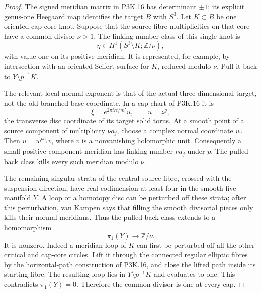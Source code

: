 \begin{proof}
The signed meridian matrix in P3K.16 has determinant
\(\pm1\); its explicit genus-one Heegaard map identifies
the target \(B\) with \(S^3\).  Let \(K\subset B\)
be one oriented cap-core knot.  Suppose that the source
fibre multiplicities on that core have a common divisor
\(\nu>1\).  The linking-number class of this single knot is
\[
            \eta\in H^1(S^3\setminus K;\mathbb Z/\nu),
\]
with value one on its positive meridian.  It is represented,
for example, by intersection with an oriented Seifert surface
for \(K\), reduced modulo \(\nu\).  Pull it back to
\(Y\setminus p^{-1}K\).

The relevant local normal exponent is that of the actual
three-dimensional target, not the old branched base coordinate.
In a cap chart of P3K.16 it is
\[
        \xi=e^{2\pi i rt/m'}u,
        \qquad u=z^g,
\]
the transverse disc coordinate of its target solid torus.
At a smooth point of a source component of multiplicity
\(\nu a_j\), choose a complex normal coordinate \(w\).
Then \(u=w^{\nu a_j}v\), where \(v\) is a nonvanishing
holomorphic unit.  Consequently a small positive component
meridian has linking number \(\nu a_j\) under \(p\).
The pulled-back class kills every such meridian modulo
\(\nu\).

The remaining singular strata of the central source fibre,
crossed with the suspension direction, have real codimension
at least four in the smooth five-manifold \(Y\).  A loop
or a homotopy disc can be perturbed off these strata; after
this perturbation, van Kampen says that filling the smooth
divisorial pieces only kills their normal meridians.  Thus
the pulled-back class extends to a homomorphism
\[
                         \pi_1(Y)\longrightarrow\mathbb Z/\nu.
\]
It is nonzero.  Indeed a meridian loop of \(K\) can first
be perturbed off all the other critical and cap-core circles.
Lift it through the connected regular elliptic fibres by the
horizontal-path construction of P3K.16, and close the lifted
path inside its starting fibre.  The resulting loop lies in
\(Y\setminus p^{-1}K\) and evaluates to one.  This
contradicts \(\pi_1(Y)=0\).  Therefore the common divisor
is one at every cap.
\end{proof}

